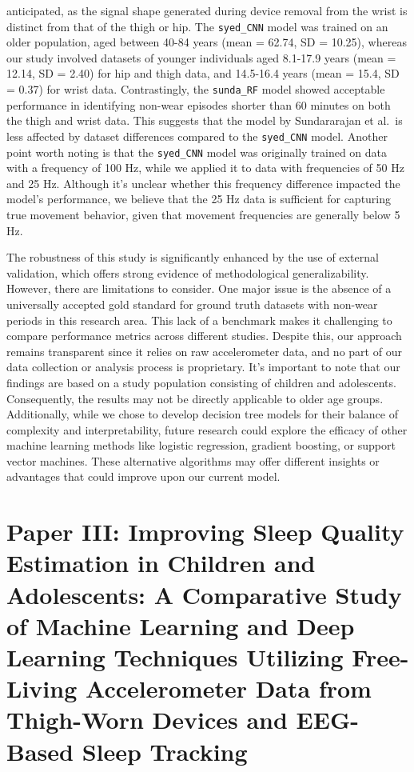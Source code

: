 \documentclass[
  10pt,
]{scrbook}
\begin{document}
anticipated, as the signal shape generated during device removal from
the wrist is distinct from that of the thigh or hip. The
\texttt{syed\_CNN} model was trained on an older population, aged
between 40-84 years (mean = 62.74, SD = 10.25), whereas our study
involved datasets of younger individuals aged 8.1-17.9 years (mean =
12.14, SD = 2.40) for hip and thigh data, and 14.5-16.4 years (mean =
15.4, SD = 0.37) for wrist data. Contrastingly, the \texttt{sunda\_RF}
model showed acceptable performance in identifying non-wear episodes
shorter than 60 minutes on both the thigh and wrist data. This suggests
that the model by Sundararajan et al.~is less affected by dataset
differences compared to the \texttt{syed\_CNN} model. Another point
worth noting is that the \texttt{syed\_CNN} model was originally trained
on data with a frequency of 100 Hz, while we applied it to data with
frequencies of 50 Hz and 25 Hz. Although it's unclear whether this
frequency difference impacted the model's performance, we believe that
the 25 Hz data is sufficient for capturing true movement behavior, given
that movement frequencies are generally below 5 Hz.

The robustness of this study is significantly enhanced by the use of
external validation, which offers strong evidence of methodological
generalizability. However, there are limitations to consider. One major
issue is the absence of a universally accepted gold standard for ground
truth datasets with non-wear periods in this research area. This lack of
a benchmark makes it challenging to compare performance metrics across
different studies. Despite this, our approach remains transparent since
it relies on raw accelerometer data, and no part of our data collection
or analysis process is proprietary. It's important to note that our
findings are based on a study population consisting of children and
adolescents. Consequently, the results may not be directly applicable to
older age groups. Additionally, while we chose to develop decision tree
models for their balance of complexity and interpretability, future
research could explore the efficacy of other machine learning methods
like logistic regression, gradient boosting, or support vector machines.
These alternative algorithms may offer different insights or advantages
that could improve upon our current model.

\hypertarget{paper-iii-improving-sleep-quality-estimation-in-children-and-adolescents-a-comparative-study-of-machine-learning-and-deep-learning-techniques-utilizing-free-living-accelerometer-data-from-thigh-worn-devices-and-eeg-based-sleep-tracking}{%
\chapter{Paper III: Improving Sleep Quality Estimation in Children and
Adolescents: A Comparative Study of Machine Learning and Deep Learning
Techniques Utilizing Free-Living Accelerometer Data from Thigh-Worn
Devices and EEG-Based Sleep
Tracking}\label{paper-iii-improving-sleep-quality-estimation-in-children-and-adolescents-a-comparative-study-of-machine-learning-and-deep-learning-techniques-utilizing-free-living-accelerometer-data-from-thigh-worn-devices-and-eeg-based-sleep-tracking}}
\end{document}
